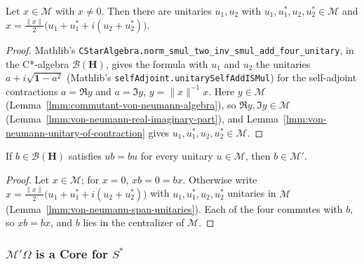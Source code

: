 \begin{lemma}
    \label{lmm:von-neumann-span-unitaries}
    \leanok
    Let $x \in \mathcal{M}$ with $x \ne 0$. Then there are unitaries $u_1, u_2$ with $u_1, u_1^*, u_2, u_2^* \in \mathcal{M}$ and $x = \tfrac{\|x\|}{2}\big(u_1 + u_1^* + i(u_2 + u_2^*)\big)$.
\end{lemma}
\begin{proof}
    \leanok
    Mathlib's \texttt{CStarAlgebra.norm\_smul\_two\_inv\_smul\_add\_four\_unitary}, in the C*-algebra $\mathcal{B}(\mathbf{H})$, gives the formula with $u_1$ and $u_2$ the unitaries $a + i\sqrt{\mathbf{1} - a^2}$ (Mathlib's \texttt{selfAdjoint.unitarySelfAddISMul}) for the self-adjoint contractions $a = \Re y$ and $a = \Im y$, $y = \|x\|^{-1}x$. Here $y \in \mathcal{M}$ (Lemma~\ref{lmm:commutant-von-neumann-algebra}), so $\Re y, \Im y \in \mathcal{M}$ (Lemma~\ref{lmm:von-neumann-real-imaginary-part}), and Lemma~\ref{lmm:von-neumann-unitary-of-contraction} gives $u_1, u_1^*, u_2, u_2^* \in \mathcal{M}$.
\end{proof}

\begin{lemma}
    \label{lmm:commutant-of-unitaries}
    \leanok
    If $b \in \mathcal{B}(\mathbf{H})$ satisfies $ub = bu$ for every unitary $u \in \mathcal{M}$, then $b \in \mathcal{M}'$.
\end{lemma}
\begin{proof}
    \leanok
    Let $x \in \mathcal{M}$; for $x = 0$, $xb = 0 = bx$. Otherwise write $x = \tfrac{\|x\|}{2}\big(u_1 + u_1^* + i(u_2 + u_2^*)\big)$ with $u_1, u_1^*, u_2, u_2^*$ unitaries in $\mathcal{M}$ (Lemma~\ref{lmm:von-neumann-span-unitaries}). Each of the four commutes with $b$, so $xb = bx$, and $b$ lies in the centralizer of $\mathcal{M}$.
\end{proof}

\subsubsection{$\mathcal{M}'\Omega$ is a Core for $S^*$}

